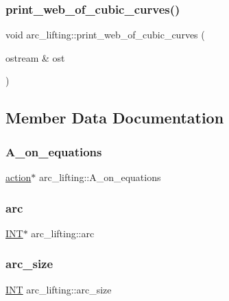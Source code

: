 \subsubsection{\texorpdfstring{print\+\_\+web\+\_\+of\+\_\+cubic\+\_\+curves()}{print\_web\_of\_cubic\_curves()}}
{\footnotesize\ttfamily void arc\+\_\+lifting\+::print\+\_\+web\+\_\+of\+\_\+cubic\+\_\+curves (\begin{DoxyParamCaption}\item[{ostream \&}]{ost }\end{DoxyParamCaption})}



\subsection{Member Data Documentation}
\mbox{\label{classarc__lifting_a4746681609a2b85ddd938ed84fd5542e}} 
\subsubsection{\texorpdfstring{A\+\_\+on\+\_\+equations}{A\_on\_equations}}
{\footnotesize\ttfamily \mbox{\hyperlink{classaction}{action}}$\ast$ arc\+\_\+lifting\+::\+A\+\_\+on\+\_\+equations}

\mbox{\label{classarc__lifting_a057e6c4873d8090f42ff29c9a8283820}} 
\subsubsection{\texorpdfstring{arc}{arc}}
{\footnotesize\ttfamily \mbox{\hyperlink{galois_8h_a09fddde158a3a20bd2dcadb609de11dc}{I\+NT}}$\ast$ arc\+\_\+lifting\+::arc}

\mbox{\label{classarc__lifting_a22856d8038ab145b6e6541c0f311eacc}} 
\subsubsection{\texorpdfstring{arc\+\_\+size}{arc\_size}}
{\footnotesize\ttfamily \mbox{\hyperlink{galois_8h_a09fddde158a3a20bd2dcadb609de11dc}{I\+NT}} arc\+\_\+lifting\+::arc\+\_\+size}

